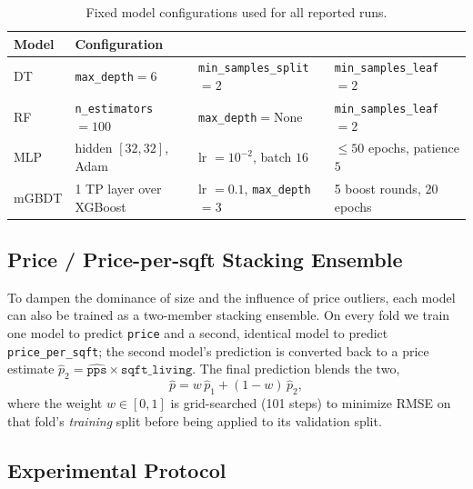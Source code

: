 \begin{table}[h]
\centering
\caption{Fixed model configurations used for all reported runs.}
\label{tab:hp_grid}
\begin{tabular}{llll}
\toprule
\textbf{Model} & \multicolumn{3}{l}{\textbf{Configuration}} \\
\midrule
DT    & \texttt{max\_depth}$=6$ & \texttt{min\_samples\_split}$=2$ & \texttt{min\_samples\_leaf}$=2$ \\
\midrule
RF    & \texttt{n\_estimators}$=100$ & \texttt{max\_depth}$=$None & \texttt{min\_samples\_leaf}$=2$ \\
\midrule
MLP   & hidden $[32,32]$, Adam & lr $=10^{-2}$, batch $16$ & $\le 50$ epochs, patience $5$ \\
\midrule
mGBDT & 1 TP layer over XGBoost & lr $=0.1$, \texttt{max\_depth}$=3$ & 5 boost rounds, $20$ epochs \\
\bottomrule
\end{tabular}
\end{table}

\subsection{Price / Price-per-sqft Stacking Ensemble}
\label{subsec:ensemble}

To dampen the dominance of size and the influence of price outliers, each model can
also be trained as a two-member stacking ensemble. On every fold we train one model
to predict \texttt{price} and a second, identical model to predict
\texttt{price\_per\_sqft}; the second model's prediction is converted back to a price
estimate $\hat{p}_{2}=\widehat{\texttt{pps}}\times\texttt{sqft\_living}$. The final
prediction blends the two,
\begin{equation}
  \hat{p} = w\,\hat{p}_{1} + (1-w)\,\hat{p}_{2},
\end{equation}
where the weight $w\in[0,1]$ is grid-searched (101 steps) to minimize RMSE on that
fold's \emph{training} split before being applied to its validation split.

\subsection{Experimental Protocol}

